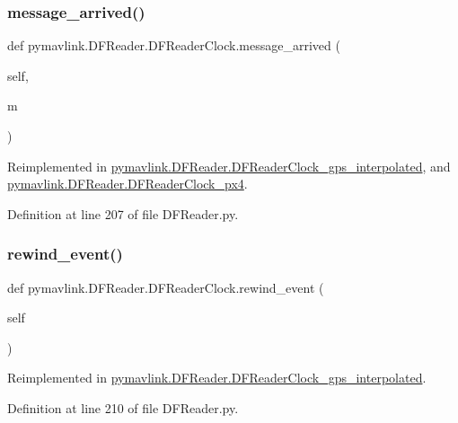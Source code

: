 \subsubsection{\texorpdfstring{message\_arrived()}{message\_arrived()}}
{\footnotesize\ttfamily def pymavlink.\+D\+F\+Reader.\+D\+F\+Reader\+Clock.\+message\+\_\+arrived (\begin{DoxyParamCaption}\item[{}]{self,  }\item[{}]{m }\end{DoxyParamCaption})}



Reimplemented in \mbox{\hyperlink{classpymavlink_1_1DFReader_1_1DFReaderClock__gps__interpolated_a299f6e30eda10492ab18a321a09a15fa}{pymavlink.\+D\+F\+Reader.\+D\+F\+Reader\+Clock\+\_\+gps\+\_\+interpolated}}, and \mbox{\hyperlink{classpymavlink_1_1DFReader_1_1DFReaderClock__px4_a8579ed60c84cf8ff01bce19e716a434f}{pymavlink.\+D\+F\+Reader.\+D\+F\+Reader\+Clock\+\_\+px4}}.



Definition at line 207 of file D\+F\+Reader.\+py.

\mbox{\label{classpymavlink_1_1DFReader_1_1DFReaderClock_a8216097142372761ae67e0ffd8ab5e69}} 
\subsubsection{\texorpdfstring{rewind\_event()}{rewind\_event()}}
{\footnotesize\ttfamily def pymavlink.\+D\+F\+Reader.\+D\+F\+Reader\+Clock.\+rewind\+\_\+event (\begin{DoxyParamCaption}\item[{}]{self }\end{DoxyParamCaption})}



Reimplemented in \mbox{\hyperlink{classpymavlink_1_1DFReader_1_1DFReaderClock__gps__interpolated_a17d0356947948b2bbeb7a47531515c72}{pymavlink.\+D\+F\+Reader.\+D\+F\+Reader\+Clock\+\_\+gps\+\_\+interpolated}}.



Definition at line 210 of file D\+F\+Reader.\+py.

\mbox{\label{classpymavlink_1_1DFReader_1_1DFReaderClock_a1f73678a08c32835bec25551701527e4}} 
